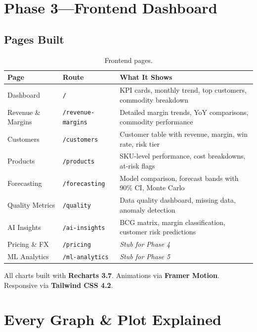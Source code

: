 \documentclass[11pt,a4paper]{article}
\newcommand{\code}[1]{\texttt{#1}}
\begin{document}
\section{Phase 3---Frontend Dashboard}

\subsection{Pages Built}

\begin{table}[H]
\centering
\small
\begin{tabularx}{\textwidth}{l l X}
\toprule
\textbf{Page} & \textbf{Route} & \textbf{What It Shows} \\
\midrule
Dashboard        & \code{/}                & KPI cards, monthly trend, top customers, commodity breakdown \\
Revenue \& Margins & \code{/revenue-margins} & Detailed margin trends, YoY comparisons, commodity performance \\
Customers        & \code{/customers}       & Customer table with revenue, margin, win rate, risk tier \\
Products         & \code{/products}        & SKU-level performance, cost breakdowns, at-risk flags \\
Forecasting      & \code{/forecasting}     & Model comparison, forecast bands with 90\% CI, Monte Carlo \\
Quality Metrics  & \code{/quality}         & Data quality dashboard, missing data, anomaly detection \\
AI Insights      & \code{/ai-insights}     & BCG matrix, margin classification, customer risk predictions \\
Pricing \& FX    & \code{/pricing}         & \textit{Stub for Phase 4} \\
ML Analytics     & \code{/ml-analytics}    & \textit{Stub for Phase 5} \\
\bottomrule
\end{tabularx}
\caption{Frontend pages.}
\end{table}

All charts built with \textbf{Recharts 3.7}. Animations via \textbf{Framer Motion}. Responsive via \textbf{Tailwind CSS 4.2}.

\section{Every Graph \& Plot Explained}
\end{document}
